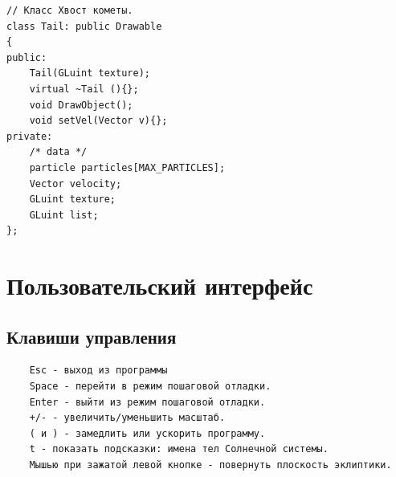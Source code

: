\documentclass[oneside,final]{article}
\begin{document}
\begin{verbatim}
// Класс Хвост кометы.
class Tail: public Drawable
{
public:
    Tail(GLuint texture);
    virtual ~Tail (){};
    void DrawObject();
    void setVel(Vector v){};
private:
    /* data */
    particle particles[MAX_PARTICLES];
    Vector velocity;
    GLuint texture;
    GLuint list;
};
\end{verbatim}

\section{Пользовательский интерфейс}
\subsection{Клавиши управления}
\begin{verbatim}
    Esc - выход из программы
    Space - перейти в режим пошаговой отладки.
    Enter - выйти из режим пошаговой отладки.
    +/- - увеличить/уменьшить масштаб.
    ( и ) - замедлить или ускорить программу.
    t - показать подсказки: имена тел Солнечной системы.
    Мышью при зажатой левой кнопке - повернуть плоскость эклиптики.
\end{verbatim}
\end{document}
